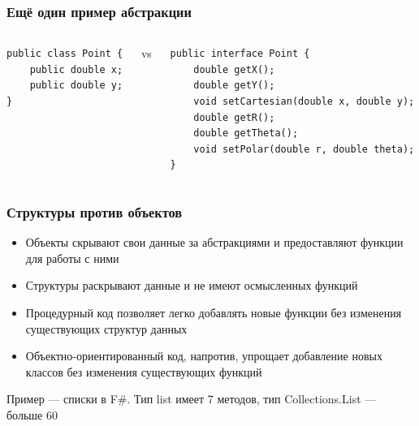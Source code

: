 \documentclass{../mcsslides}
\begin{document}
    \begin{frame}[fragile]
        \frametitle{Ещё один пример абстракции}
        \begin{columns}
            \begin{column}{0.32\textwidth}
                \begin{verbatim}
public class Point {
    public double x;
    public double y;
}
                \end{verbatim}
            \end{column}
            \begin{column}{0.05\textwidth}
                vs
            \end{column}
            \begin{column}{0.65\textwidth}
                \begin{verbatim}
public interface Point {
    double getX();
    double getY();
    void setCartesian(double x, double y);
    double getR();
    double getTheta();
    void setPolar(double r, double theta);
}
                \end{verbatim}
            \end{column}
        \end{columns}
    \end{frame}

    \begin{frame}
        \frametitle{Структуры против объектов}
        \begin{itemize}
            \item Объекты скрывают свои данные за абстракциями и предоставляют функции для работы с ними
            \item Структуры раскрывают данные и не имеют осмысленных функций
        \end{itemize}
        \vspace{3mm}
        \begin{itemize}
            \item Процедурный код позволяет легко добавлять новые функции без изменения существующих структур данных
            \item Объектно-ориентированный код, напротив, упрощает добавление новых классов без изменения существующих функций
        \end{itemize}
        \vspace{3mm}
        Пример --- списки в F\#. Тип list имеет 7 методов, тип Collections.List --- больше 60
    \end{frame}
\end{document}

